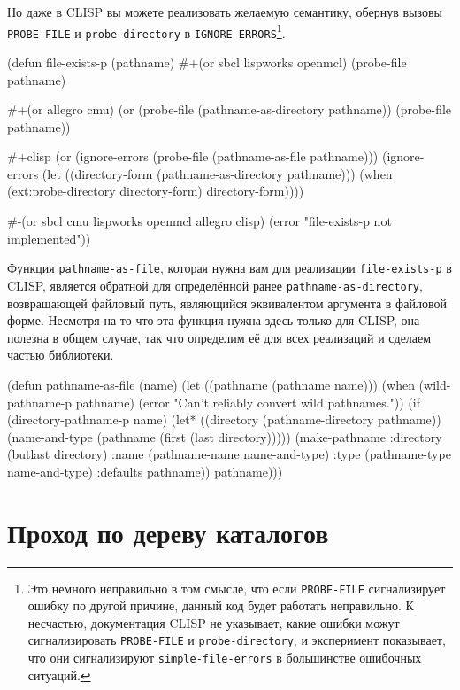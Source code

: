 Но даже в CLISP вы можете реализовать желаемую семантику, обернув вызовы \lstinline{PROBE-FILE}
и \lstinline{probe-directory} в \lstinline{IGNORE-ERRORS}\footnote{Это немного неправильно в том
  смысле, что если \lstinline{PROBE-FILE} сигнализирует ошибку по другой причине, данный код
  будет работать неправильно. К несчастью, документация CLISP не указывает, какие ошибки
  можут сигнализировать \lstinline{PROBE-FILE} и \lstinline{probe-directory}, и эксперимент
  показывает, что они сигнализируют \lstinline{simple-file-errors} в большинстве ошибочных
  ситуаций.}.

\begin{myverb}
(defun file-exists-p (pathname)
  #+(or sbcl lispworks openmcl)
  (probe-file pathname)

  #+(or allegro cmu)
  (or (probe-file (pathname-as-directory pathname))
      (probe-file pathname))

  #+clisp
  (or (ignore-errors
        (probe-file (pathname-as-file pathname)))
      (ignore-errors
        (let ((directory-form (pathname-as-directory pathname)))
          (when (ext:probe-directory directory-form)
            directory-form))))

  #-(or sbcl cmu lispworks openmcl allegro clisp)
  (error "file-exists-p not implemented"))
\end{myverb}

Функция \lstinline{pathname-as-file}, которая нужна вам для реализации \lstinline{file-exists-p} в
CLISP, является обратной для определённой ранее \lstinline{pathname-as-directory}, возвращающей
файловый путь, являющийся эквивалентом аргумента в файловой форме. Несмотря на то что эта
функция нужна здесь только для CLISP, она полезна в общем случае, так что определим её для
всех реализаций и сделаем частью библиотеки.

\begin{myverb}
(defun pathname-as-file (name)
  (let ((pathname (pathname name)))
    (when (wild-pathname-p pathname)
      (error "Can't reliably convert wild pathnames."))
    (if (directory-pathname-p name)
      (let* ((directory (pathname-directory pathname))
             (name-and-type (pathname (first (last directory)))))
        (make-pathname
         :directory (butlast directory)
         :name (pathname-name name-and-type)
         :type (pathname-type name-and-type)
         :defaults pathname))
      pathname)))
\end{myverb}

\section{Проход по дереву каталогов}

